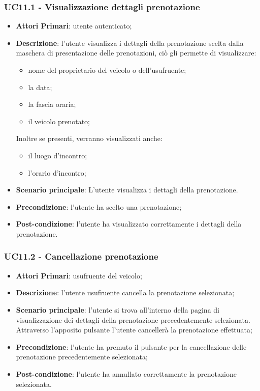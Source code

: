  \subsubsection{UC11.1 - Visualizzazione dettagli prenotazione}
\begin{itemize}
	\item \textbf{Attori Primari}: utente autenticato;
	\item \textbf{Descrizione}: l'utente visualizza i dettagli della prenotazione scelta dalla maschera di presentazione delle prenotazioni, ciò gli permette di visualizzare:
	\begin{itemize}
		\item nome del proprietario del veicolo o dell'usufruente;
		\item la data;
		\item la fascia oraria;
		\item il veicolo prenotato;
	\end{itemize}
	Inoltre se presenti, verranno visualizzati anche:
	\begin{itemize}		
		\item il luogo d'incontro;
		\item l'orario d'incontro;
	\end{itemize}
	\item \textbf{Scenario principale}: L'utente visualizza i dettagli della prenotazione.	
	\item \textbf{Precondizione}: l'utente ha scelto una prenotazione;
	\item \textbf{Post-condizione}: l'utente ha visualizzato correttamente i dettagli della prenotazione.
\end{itemize}

\subsubsection{UC11.2 - Cancellazione prenotazione}
\begin{itemize}
	\item \textbf{Attori Primari}: usufruente del veicolo;
	\item \textbf{Descrizione}: l'utente usufruente cancella la prenotazione selezionata;
	\item \textbf{Scenario principale}: l'utente si trova all'interno della pagina di visualizzazione dei dettagli della prenotazione precedentemente selezionata. Attraverso l'apposito pulsante l'utente cancellerà la prenotazione effettuata;
	\item \textbf{Precondizione}: l'utente ha premuto il pulsante per la cancellazione delle prenotazione precedentemente selezionata;
	\item \textbf{Post-condizione}: l'utente ha annullato correttamente la prenotazione selezionata.
\end{itemize}

